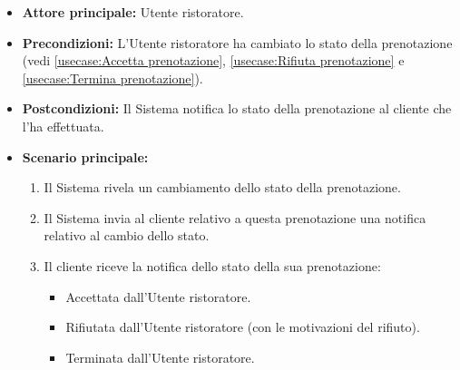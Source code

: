 \label{usecase:Notifica stato della prenotazione}
\begin{itemize}
	\item \textbf{Attore principale:} Utente ristoratore.
	
	\item \textbf{Precondizioni:} L'Utente ristoratore ha cambiato lo stato della prenotazione (vedi \autoref{usecase:Accetta prenotazione},
     \autoref{usecase:Rifiuta prenotazione} e \autoref{usecase:Termina prenotazione}).

    
	\item \textbf{Postcondizioni:} Il Sistema notifica lo stato della prenotazione al cliente che l'ha effettuata.
     
	\item \textbf{Scenario principale:}
	      \begin{enumerate}
                \item Il Sistema rivela un cambiamento dello stato della prenotazione.
                \item Il Sistema invia al cliente relativo a questa prenotazione una notifica relativo al cambio dello stato.
                \item Il cliente riceve la notifica dello stato della sua prenotazione:
                \begin{itemize}
                    \item Accettata dall'Utente ristoratore.
                    \item Rifiutata dall'Utente ristoratore (con le motivazioni del rifiuto).
                    \item Terminata dall'Utente ristoratore.
                \end{itemize}
	      \end{enumerate}
\end{itemize}